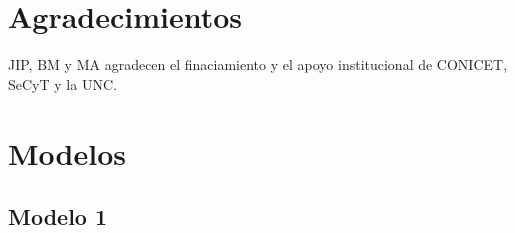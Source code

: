\documentclass[aps,prl,twocolumn,groupedaddress]{revtex4-2}
\begin{document}



\section{Agradecimientos}

\begin{acknowledgments}
JIP, BM y MA agradecen el finaciamiento y el apoyo institucional de CONICET, SeCyT y la UNC.
\end{acknowledgments}



\onecolumngrid

\appendix

\section{Modelos}

\subsection{Modelo 1}
\end{document}
